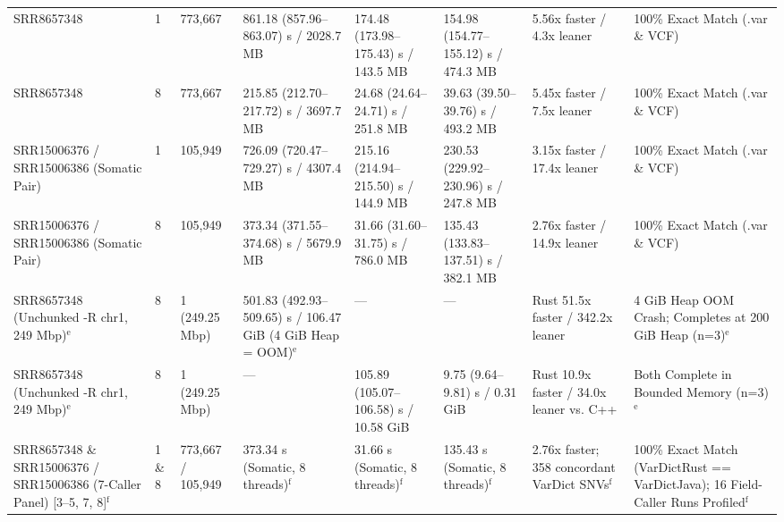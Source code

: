 \begin{table}[htbp]
{\begin{tabular}{llllllll}
SRR8657348 & 1 & 773,667 & 861.18 (857.96--863.07) s / 2028.7 MB & 174.48 (173.98--175.43) s / 143.5 MB & 154.98 (154.77--155.12) s / 474.3 MB & 5.56x faster / 4.3x leaner & 100\% Exact Match (.var \& VCF) \\
SRR8657348 & 8 & 773,667 & 215.85 (212.70--217.72) s / 3697.7 MB & 24.68 (24.64--24.71) s / 251.8 MB & 39.63 (39.50--39.76) s / 493.2 MB & 5.45x faster / 7.5x leaner & 100\% Exact Match (.var \& VCF) \\
SRR15006376 / SRR15006386 (Somatic Pair) & 1 & 105,949 & 726.09 (720.47--729.27) s / 4307.4 MB & 215.16 (214.94--215.50) s / 144.9 MB & 230.53 (229.92--230.96) s / 247.8 MB & 3.15x faster / 17.4x leaner & 100\% Exact Match (.var \& VCF) \\
SRR15006376 / SRR15006386 (Somatic Pair) & 8 & 105,949 & 373.34 (371.55--374.68) s / 5679.9 MB & 31.66 (31.60--31.75) s / 786.0 MB & 135.43 (133.83--137.51) s / 382.1 MB & 2.76x faster / 14.9x leaner & 100\% Exact Match (.var \& VCF) \\
SRR8657348 (Unchunked -R chr1, 249 Mbp)$^{\text{e}}$ & 8 & 1 (249.25 Mbp) & 501.83 (492.93--509.65) s / 106.47 GiB (4 GiB Heap = OOM)$^{\text{e}}$ & --- & --- & Rust 51.5x faster / 342.2x leaner & 4 GiB Heap OOM Crash; Completes at 200 GiB Heap (n=3)$^{\text{e}}$ \\
SRR8657348 (Unchunked -R chr1, 249 Mbp)$^{\text{e}}$ & 8 & 1 (249.25 Mbp) & --- & 105.89 (105.07--106.58) s / 10.58 GiB & 9.75 (9.64--9.81) s / 0.31 GiB & Rust 10.9x faster / 34.0x leaner vs. C++ & Both Complete in Bounded Memory (n=3)$^{\text{e}}$ \\
SRR8657348 \& SRR15006376 / SRR15006386 (7-Caller Panel) [3--5, 7, 8]$^{\text{f}}$ & 1 \& 8 & 773,667 / 105,949 & 373.34 s (Somatic, 8 threads)$^{\text{f}}$ & 31.66 s (Somatic, 8 threads)$^{\text{f}}$ & 135.43 s (Somatic, 8 threads)$^{\text{f}}$ & 2.76x faster; 358 concordant VarDict SNVs$^{\text{f}}$ & 100\% Exact Match (VarDictRust == VarDictJava); 16 Field-Caller Runs Profiled$^{\text{f}}$ \\
\hline
\end{tabular}%
}

\end{table}
